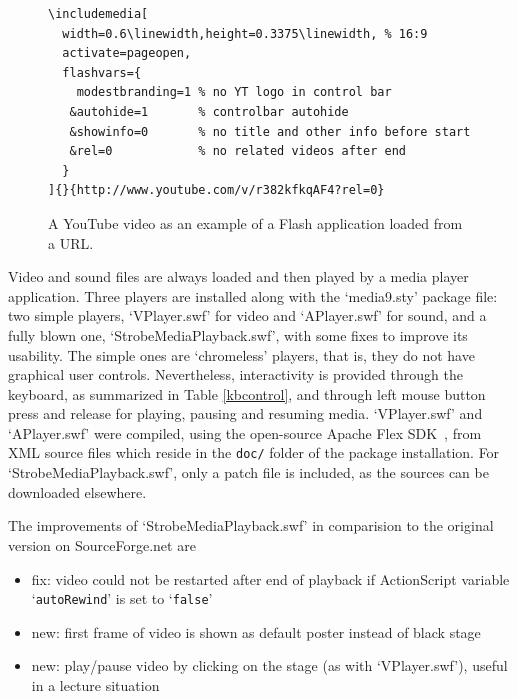 \documentclass[a4paper]{article}
\begin{document}
\begin{figure}[H]
\centering
\begin{Verbatim}
\includemedia[
  width=0.6\linewidth,height=0.3375\linewidth, % 16:9
  activate=pageopen,
  flashvars={
    modestbranding=1 % no YT logo in control bar
   &autohide=1       % controlbar autohide
   &showinfo=0       % no title and other info before start
   &rel=0            % no related videos after end
  }
]{}{http://www.youtube.com/v/r382kfkqAF4?rel=0}
\end{Verbatim}
\vspace{1ex}
\caption{A YouTube video as an example of a Flash application loaded from a URL.}\label{alien}
\end{figure}

Video and sound files are always loaded and then played by a media player application. Three players are installed along with the `media9.sty' package file: two simple players, `VPlayer.swf' for video and `APlayer.swf' for sound, and a fully blown one, `StrobeMediaPlayback.swf', with some fixes to improve its usability. The simple ones are `chromeless' players, that is, they do not have graphical user controls. Nevertheless, interactivity is provided through the keyboard, as summarized in Table \ref{kbcontrol}, and through left mouse button press and release for playing, pausing and resuming media. `VPlayer.swf' and `APlayer.swf' were compiled, using the open-source Apache Flex SDK~\cite{flex}, from XML source files which reside in the \verb+doc/+ folder of the package installation. For `StrobeMediaPlayback.swf', only a patch file is included, as the sources can be downloaded elsewhere.

The improvements of `StrobeMediaPlayback.swf' in comparision to the original version on SourceForge.net are
\begin{itemize}
  \item fix: video could not be restarted after end of playback if ActionScript variable `{\tt autoRewind}' is set to `{\tt false}'
  \item new: first frame of video is shown as default poster instead of black stage
  \item new: play/pause video by clicking on the stage (as with `VPlayer.swf'), useful in a lecture situation
\end{itemize}
\end{document}
